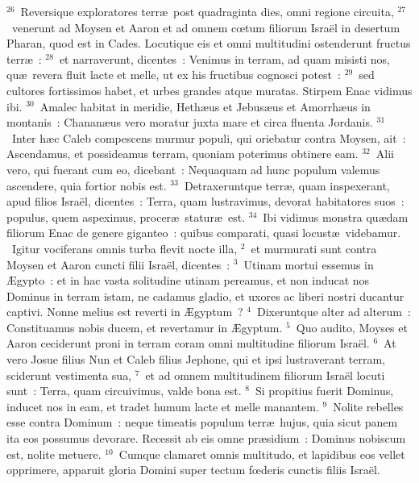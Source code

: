 ${}^{26}$~Reversique exploratores terr\ae\ post quadraginta dies, omni regione circuita,
${}^{27}$~venerunt ad Moysen et Aaron et ad omnem cœtum filiorum Isra\"el in desertum Pharan, quod est in Cades. Locutique eis et omni multitudini ostenderunt fructus terr\ae~:
${}^{28}$~et narraverunt, dicentes~: Venimus in terram, ad quam misisti nos, qu\ae\ revera fluit lacte et melle, ut ex his fructibus cognosci potest~:
${}^{29}$~sed cultores fortissimos habet, et urbes grandes atque muratas. Stirpem Enac vidimus ibi.
${}^{30}$~Amalec habitat in meridie, Heth\ae us et Jebus\ae us et Amorrh\ae us in montanis~: Chanan\ae us vero moratur juxta mare et circa fluenta Jordanis.
${}^{31}$~Inter h\ae c Caleb compescens murmur populi, qui oriebatur contra Moysen, ait~: Ascendamus, et possideamus terram, quoniam poterimus obtinere eam.
${}^{32}$~Alii vero, qui fuerant cum eo, dicebant~: Nequaquam ad hunc populum valemus ascendere, quia fortior nobis est.
${}^{33}$~Detraxeruntque terr\ae , quam inspexerant, apud filios Isra\"el, dicentes~: Terra, quam lustravimus, devorat habitatores suos~: populus, quem aspeximus, procer\ae\ statur\ae\ est.
${}^{34}$~Ibi vidimus monstra qu\ae dam filiorum Enac de genere giganteo~: quibus comparati, quasi locust\ae\ videbamur.
~Igitur vociferans omnis turba flevit nocte illa,
${}^{2}$~et murmurati sunt contra Moysen et Aaron cuncti filii Isra\"el, dicentes~:
${}^{3}$~Utinam mortui essemus in \AE gypto~: et in hac vasta solitudine utinam pereamus, et non inducat nos Dominus in terram istam, ne cadamus gladio, et uxores ac liberi nostri ducantur captivi. Nonne melius est reverti in \AE gyptum~?
${}^{4}$~Dixeruntque alter ad alterum~: Constituamus nobis ducem, et revertamur in \AE gyptum.
${}^{5}$~Quo audito, Moyses et Aaron ceciderunt proni in terram coram omni multitudine filiorum Isra\"el.
${}^{6}$~At vero Josue filius Nun et Caleb filius Jephone, qui et ipsi lustraverant terram, sciderunt vestimenta sua,
${}^{7}$~et ad omnem multitudinem filiorum Isra\"el locuti sunt~: Terra, quam circuivimus, valde bona est.
${}^{8}$~Si propitius fuerit Dominus, inducet nos in eam, et tradet humum lacte et melle manantem.
${}^{9}$~Nolite rebelles esse contra Dominum~: neque timeatis populum terr\ae\ hujus, quia sicut panem ita eos possumus devorare. Recessit ab eis omne pr\ae sidium~: Dominus nobiscum est, nolite metuere.
${}^{10}$~Cumque clamaret omnis multitudo, et lapidibus eos vellet opprimere, apparuit gloria Domini super tectum fœderis cunctis filiis Isra\"el.


